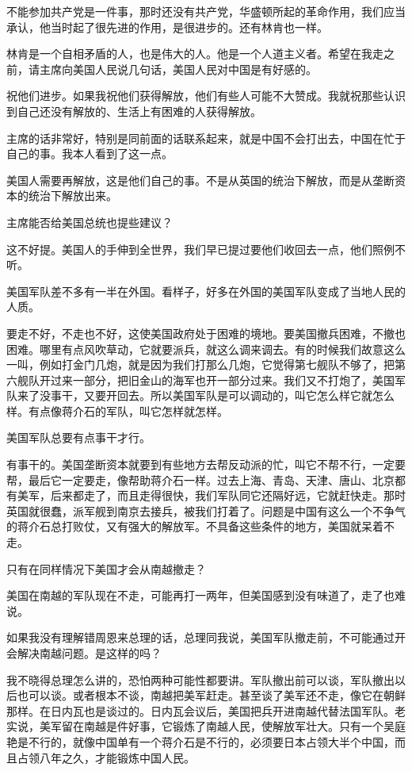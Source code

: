 不能参加共产党是一件事，那时还没有共产党，华盛顿所起的革命作用，我们应当承认，他当时起了很先进的作用，是很进步的。还有林肯也一样。

林肯是一个自相矛盾的人，也是伟大的人。他是一个人道主义者。希望在我走之前，请主席向美国人民说几句话，美国人民对中国是有好感的。

祝他们进步。如果我祝他们获得解放，他们有些人可能不大赞成。我就祝那些认识到自己还没有解放的、生活上有困难的人获得解放。

主席的话非常好，特别是同前面的话联系起来，就是中国不会打出去，中国在忙于自己的事。我本人看到了这一点。

美国人需要再解放，这是他们自己的事。不是从英国的统治下解放，而是从垄断资本的统治下解放出来。

主席能否给美国总统也提些建议？

这不好提。美国人的手伸到全世界，我们早已提过要他们收回去一点，他们照例不听。

美国军队差不多有一半在外国。看样子，好多在外国的美国军队变成了当地人民的人质。

要走不好，不走也不好，这使美国政府处于困难的境地。要美国撤兵困难，不撤也困难。哪里有点风吹草动，它就要派兵，就这么调来调去。有的时候我们故意这么一叫，例如打金门几炮，就是因为我们打那么几炮，它觉得第七舰队不够了，把第六舰队开过来一部分，把旧金山的海军也开一部分过来。我们又不打炮了，美国军队来了没事干，又要开回去。所以美国军队是可以调动的，叫它怎么样它就怎么样。有点像蒋介石的军队，叫它怎样就怎样。

美国军队总要有点事干才行。

有事干的。美国垄断资本就要到有些地方去帮反动派的忙，叫它不帮不行，一定要帮，最后它一定要走，像帮助蒋介石一样。过去上海、青岛、天津、唐山、北京都有美军，后来都走了，而且走得很快，我们军队同它还隔好远，它就赶快走。那时英国就很蠢，派军舰到南京去接兵，被我们打着了。问题是中国有这么一个不争气的蒋介石总打败仗，又有强大的解放军。不具备这些条件的地方，美国就呆着不走。

只有在同样情况下美国才会从南越撤走？

美国在南越的军队现在不走，可能再打一两年，但美国感到没有味道了，走了也难说。

如果我没有理解错周恩来总理的话，总理同我说，美国军队撤走前，不可能通过开会解决南越问题。是这样的吗？

我不晓得总理怎么讲的，恐怕两种可能性都要讲。军队撤出前可以谈，军队撤出以后也可以谈。或者根本不谈，南越把美军赶走。甚至谈了美军还不走，像它在朝鲜那样。在日内瓦也是谈过的。日内瓦会议后，美国把兵开进南越代替法国军队。老实说，美军留在南越是件好事，它锻炼了南越人民，使解放军壮大。只有一个吴庭艳是不行的，就像中国单有一个蒋介石是不行的，必须要日本占领大半个中国，而且占领八年之久，才能锻炼中国人民。

